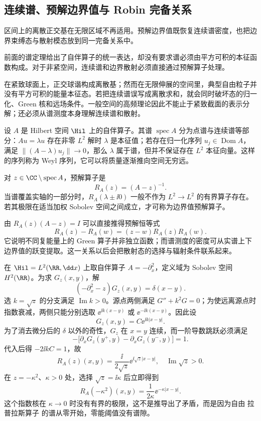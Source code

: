 \subsection{连续谱、预解边界值与 Robin 完备关系}

区间上的离散正交基在无限区域不再适用。预解边界值既恢复连续谱密度，也把边界束缚态与散射模态放到同一完备关系中。

前面的谱定理给出了自伴算子的统一表达，却没有要求谱必须由平方可积的本征函数构成。对于非紧空间，连续谱和边界散射必须直接通过预解算子处理。

在紧致球面上，正交球谐构成离散基；然而在无限伸展的空间里，典型自由粒子并没有平方可积的能量本征态。若把连续谱误写成离散求和，就会同时破坏态的归一化、Green 核和远场条件。一般空间的高频理论因此不能止于紧致截面的表示分解；还必须从谱测度本身理解连续谱和散射。

设 $A$ 是 Hilbert 空间 $\Hil$ 上的自伴算子。其谱 $\operatorname{spec}A$ 分为点谱与连续谱等部分：$Au=\lambda u$ 存在非零 $L^2$ 解时 $\lambda$ 是本征值；若存在归一化序列 $u_j\in\operatorname{Dom}A$，满足 $\|(A-\lambda)u_j\|\to0$，那么 $\lambda$ 属于谱，但并不保证存在 $L^2$ 本征向量。这样的序列称为 Weyl 序列，它可以将质量逐渐推向空间无穷远。

\begin{definition}[预解式与边界值]
对 $z\in\CC\setminus\operatorname{spec}A$，预解算子是
\begin{equation}\label{eq:ghs-r6-resolvent-definition}
R_A(z)=(A-z)^{-1}.
\end{equation}
当谱覆盖实轴的一部分时，$R_A(\lambda\pm\ii0)$ 一般不作为 $L^2\to L^2$ 的有界算子存在。若其极限在适当加权 Sobolev 空间之间成立，才可称为边界值预解算子。
\end{definition}

由 $R_A(z)(A-z)=I$ 可以直接推得预解恒等式
\begin{equation}\label{eq:ghs-r6-resolvent-identity}
R_A(z)-R_A(w)=(z-w)R_A(z)R_A(w).
\end{equation}
它说明不同复能量上的 Green 算子并非独立函数；而谱测度的密度可从实谱上下边界值的跃变提取。这一关系以后会把散射态的选择与辐射条件联系起来。

在 $\Hil=L^2(\RR,\dd x)$ 上取自伴算子 $A=-\partial_x^2$，定义域为 Sobolev 空间 $H^2(\RR)$。为求 $G_z(x,y)$，解
\[
(-\partial_x^2-z)G_z(x,y)=\delta(x-y).
\]
选 $k=\sqrt z$ 的分支满足 $\operatorname{Im}k>0$。源点两侧满足 $G''+k^2G=0$；为使远离源点时指数衰减，两侧只能分别选取 $\ee^{\ii k(x-y)}$ 或 $\ee^{-\ii k(x-y)}$。因此设
\[
G_z(x,y)=C\ee^{\ii k|x-y|}.
\]
为了消去微分后的 $\delta$ 以外的奇性，$G_z$ 在 $x=y$ 连续，而一阶导数跳跃必须满足
\[
-\bigl[\partial_xG_z(y^+,y)-\partial_xG_z(y^-,y)\bigr]=1.
\]
代入后得 $-2\ii kC=1$，故
\begin{equation}\label{eq:ghs-r6-line-resolvent}
R_A(z)(x,y)=\frac{\ii}{2\sqrt z}\ee^{\ii\sqrt z|x-y|},
\quad\operatorname{Im}\sqrt z>0.
\end{equation}
在 $z=-\kappa^2$、$\kappa>0$ 处，选择 $\sqrt z=\ii\kappa$ 后立即得到
\[
R_A(-\kappa^2)(x,y)=\frac{1}{2\kappa}\ee^{-\kappa|x-y|}.
\]
这个指数核在 $\kappa\to0$ 时没有有界的极限，这不是推导出了矛盾，而是因为自由 拉普拉斯算子 的谱从零开始，零能阈值没有谱隙。

